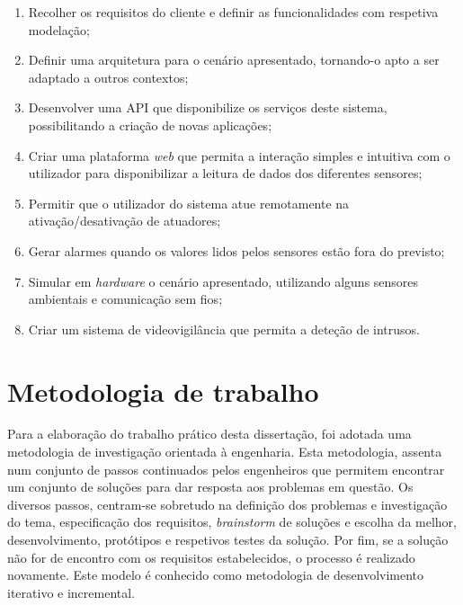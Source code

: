 \begin{enumerate}

	\item Recolher os requisitos do cliente e definir as funcionalidades com respetiva modelação; 
	
	\item Definir uma arquitetura para o cenário apresentado, tornando-o apto a ser adaptado a outros contextos; 
	
	\item Desenvolver uma \ac{API} que disponibilize os serviços deste sistema, possibilitando a criação de novas aplicações;   
	
	\item Criar uma plataforma \textit{web} que permita a  interação simples e intuitiva com o utilizador para disponibilizar a leitura de dados dos diferentes sensores; 
	
	\item Permitir que o utilizador do sistema atue remotamente na ativação/desativação de atuadores; 
	
	
	\item Gerar alarmes quando os valores lidos pelos sensores estão fora do previsto; 
	
	\item Simular em \textit{hardware} o cenário apresentado, utilizando alguns sensores ambientais e comunicação sem fios; 
	
	\item Criar um sistema de videovigilância que permita a deteção de intrusos.

\end{enumerate}










\section{Metodologia de trabalho}
\label{method}


Para a elaboração do trabalho prático desta dissertação, foi adotada uma metodologia de investigação orientada à engenharia. Esta metodologia, assenta num conjunto de passos continuados pelos engenheiros que permitem encontrar um conjunto de soluções para dar resposta aos problemas em questão. Os diversos passos, centram-se sobretudo na definição dos problemas e investigação do tema, especificação dos requisitos, \textit{brainstorm} de soluções e escolha da melhor, desenvolvimento, protótipos e respetivos testes da solução. Por fim, se a solução não for de encontro com os requisitos estabelecidos, o processo é realizado novamente\cite{desingprocess}. Este modelo é conhecido como metodologia de desenvolvimento iterativo e incremental. 


